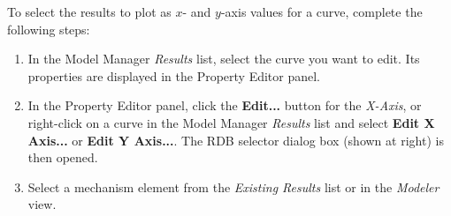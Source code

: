 \begin{minipage}{0.64\textwidth}
  \raggedright
  To select the results to plot as $x$- and $y$-axis values for a curve,
  complete the following steps:

  \medskip
  \begin{enumerate}
    \setlength\itemsep{1mm}
  \item
    In the Model Manager {\sl Results} list, select the curve you want to edit.
    Its properties are displayed in the Property Editor panel.
  \item
    In the Property Editor panel, click the \textbf{Edit...} button for the
    {\sl X-Axis}, or right-click on a curve in the Model Manager {\sl Results}
    list and select \textbf{Edit X Axis...} or \textbf{Edit Y Axis...}.
    The RDB selector dialog box (shown at right) is then opened.
  \item
    Select a mechanism element from the {\sl Existing Results} list or in the
    {\sl Modeler} view.
    \vskip1mm
  \end{enumerate}
\end{minipage}%
